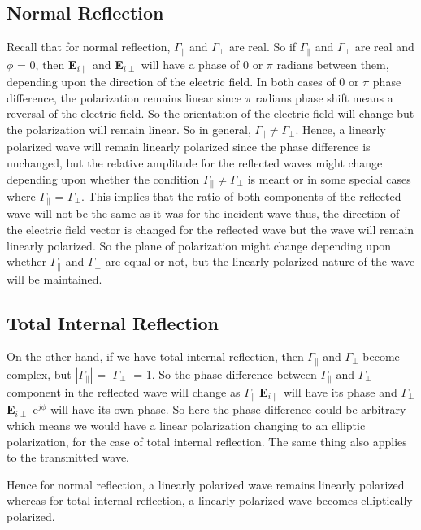 \subsection{Normal Reflection}
Recall that for normal reflection, $\Gamma_\parallel$ and $\Gamma_\perp$ are real. So if $\Gamma_\parallel$ and $\Gamma_\perp$ are real and $\phi$ = 0, then \textbf{E}$_{i\parallel}$ and \textbf{E}$_{i\perp}$ will have a phase of $0$ or $\pi$ radians between them, depending upon the direction of the electric field. In both cases of 0 or $\pi$ phase difference, the polarization remains linear since $\pi$ radians phase shift means a reversal of the electric field. So the orientation of the electric field will change but the polarization will remain linear. So in general, $\Gamma_\parallel \neq \Gamma_\perp$. Hence, a linearly polarized wave will remain linearly polarized since the phase difference is unchanged, but the relative amplitude for the reflected waves might change depending upon whether the condition $\Gamma_\parallel \neq \Gamma_\perp$ is meant or in some special cases where $\Gamma_\parallel$ = $\Gamma_\perp$. This implies that the ratio of both components of the reflected wave will not be the same as it was for the incident wave thus, the direction of the electric field vector is changed for the reflected wave but the wave will remain linearly polarized. So the plane of polarization might change depending upon whether $\Gamma_\parallel$ and $\Gamma_\perp$ are equal or not, but the linearly polarized nature of the wave will be maintained.

\subsection{Total Internal Reflection}
On the other hand, if we have total internal reflection, then $\Gamma_\parallel$ and $\Gamma_\perp$ become complex, but $|\Gamma_\parallel|$ = $|\Gamma_\perp|$ = 1. So the phase difference between $\Gamma_\parallel$ and $\Gamma_\perp$ component in the reflected wave will change as $\Gamma_\parallel$ \textbf{E}$_{i\parallel}$ will have its phase and $\Gamma_\perp$ \textbf{E}$_{i\perp}$ e$^{j\phi}$ will have its own phase. So here the phase difference could be arbitrary which means we would have a linear polarization changing to an elliptic polarization, for the case of total internal reflection. The same thing also applies to the transmitted wave. 

Hence for normal reflection, a linearly polarized wave remains linearly polarized whereas for total internal reflection, a linearly polarized wave becomes elliptically polarized.

